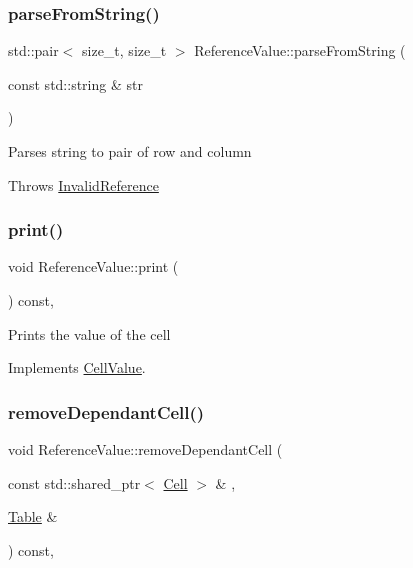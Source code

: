 \subsubsection{\texorpdfstring{parse\+From\+String()}{parseFromString()}}
{\footnotesize\ttfamily std\+::pair$<$ size\+\_\+t, size\+\_\+t $>$ Reference\+Value\+::parse\+From\+String (\begin{DoxyParamCaption}\item[{const std\+::string \&}]{str }\end{DoxyParamCaption})\hspace{0.3cm}{\ttfamily [static]}}

Parses string to pair of row and column

Throws \hyperlink{structInvalidReference}{Invalid\+Reference} \mbox{\label{classReferenceValue_a24850974f891910d5f9298db29239e1e}} 
\subsubsection{\texorpdfstring{print()}{print()}}
{\footnotesize\ttfamily void Reference\+Value\+::print (\begin{DoxyParamCaption}{ }\end{DoxyParamCaption}) const\hspace{0.3cm}{\ttfamily [override]}, {\ttfamily [virtual]}}

Prints the value of the cell 

Implements \hyperlink{classCellValue_a12d1cf68a5ba83f0c375441729772742}{Cell\+Value}.

\mbox{\label{classReferenceValue_a8cfd2b3e5f8d18b50ab523e7f9c8ad02}} 
\subsubsection{\texorpdfstring{remove\+Dependant\+Cell()}{removeDependantCell()}}
{\footnotesize\ttfamily void Reference\+Value\+::remove\+Dependant\+Cell (\begin{DoxyParamCaption}\item[{const std\+::shared\+\_\+ptr$<$ \hyperlink{classCell}{Cell} $>$ \&}]{,  }\item[{\hyperlink{classTable}{Table} \&}]{ }\end{DoxyParamCaption}) const\hspace{0.3cm}{\ttfamily [override]}, {\ttfamily [virtual]}}

